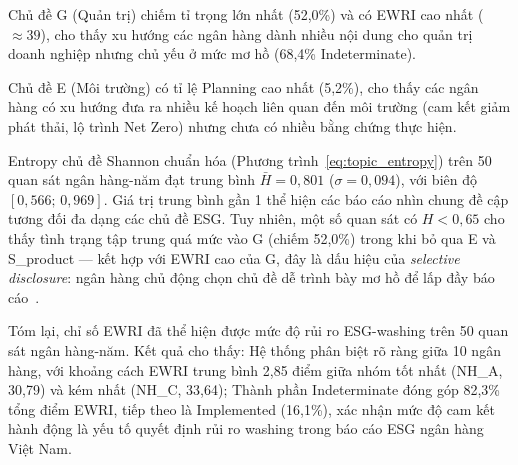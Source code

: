 Chủ đề G (Quản trị) chiếm tỉ trọng lớn nhất (52,0\%) và có EWRI cao nhất ($\approx 39$), cho thấy xu hướng các ngân hàng dành nhiều nội dung cho quản trị doanh nghiệp nhưng chủ yếu ở mức mơ hồ (68,4\% Indeterminate).

Chủ đề E (Môi trường) có tỉ lệ Planning cao nhất (5,2\%), cho thấy các ngân hàng có xu hướng đưa ra nhiều kế hoạch liên quan đến môi trường (cam kết giảm phát thải, lộ trình Net Zero) nhưng chưa có nhiều bằng chứng thực hiện.

Entropy chủ đề Shannon chuẩn hóa (Phương trình~\ref{eq:topic_entropy}) trên 50 quan sát ngân hàng-năm đạt trung bình $\bar{H} = 0{,}801$ ($\sigma = 0{,}094$), với biên độ $[0{,}566;\, 0{,}969]$. Giá trị trung bình gần 1 thể hiện các báo cáo nhìn chung đề cập tương đối đa dạng các chủ đề ESG. Tuy nhiên, một số quan sát có $H < 0{,}65$ cho thấy tình trạng tập trung quá mức vào G (chiếm 52,0\%) trong khi bỏ qua E và S\_product --- kết hợp với EWRI cao của G, đây là dấu hiệu của \textit{selective disclosure}: ngân hàng chủ động chọn chủ đề dễ trình bày mơ hồ để lấp đầy báo cáo~\cite{marquis2016scrutiny}.

Tóm lại, chỉ số EWRI đã thể hiện được mức độ rủi ro ESG-washing trên 50 quan sát ngân hàng-năm. Kết quả cho thấy: Hệ thống phân biệt rõ ràng giữa 10 ngân hàng, với khoảng cách EWRI trung bình 2,85 điểm giữa nhóm tốt nhất (NH\_A, 30,79) và kém nhất (NH\_C, 33,64); Thành phần Indeterminate đóng góp 82,3\% tổng điểm EWRI, tiếp theo là Implemented (16,1\%), xác nhận mức độ cam kết hành động là yếu tố quyết định rủi ro washing trong báo cáo ESG ngân hàng Việt Nam.





